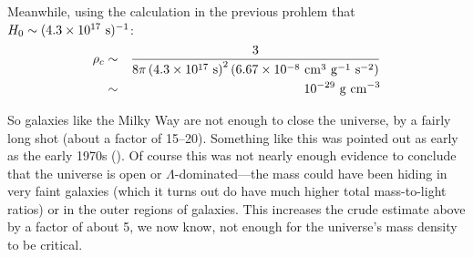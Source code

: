 \begin{enumerate}
\begin{answer}
    Meanwhile, using the calculation in the previous prohlem that
    $H_0 \sim (4.3 \times 10^{17} {\rm
    ~s})^{-1}$:
    \begin{eqnarray}
     \rho_c &\sim& \frac{3}{8 \pi \left(4.3 \times
     10^{17} {\rm ~s}\right)^2 \left(6.67 \times 10^{-8} {\rm ~cm}^3
      {\rm ~g}^{-1} {\rm ~s}^{-2}\right)} \cr
      &\sim& 10^{-29} {\rm ~g} {\rm ~cm}^{-3}
    \end{eqnarray}

    So galaxies like the Milky Way are not enough to close the
    universe, by a fairly long shot (about a factor of
    15--20). Something like this was pointed out as early as the early
    1970s (\cite{gott74a}). Of course this was not nearly enough
    evidence to conclude that the universe is open or
    $\Lambda$-dominated---the mass could have been hiding in very
    faint galaxies (which it turns out do have much higher total
    mass-to-light ratios) or in the outer regions of galaxies. This
    increases the crude estimate above by a factor of about 5, we now
    know, not enough for the universe's mass density to be
    critical.  \end{answer}
\end{enumerate}   






  

